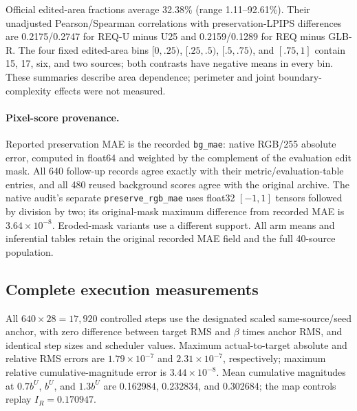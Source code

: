 \documentclass[10pt,doubleanonymous]{ieeeconf}
\begin{document}
Official edited-area fractions average 32.38\% (range 1.11--92.61\%). Their unadjusted Pearson/Spearman correlations with preservation-LPIPS differences are 0.2175/0.2747 for REQ-U minus U25 and 0.2159/0.1289 for REQ minus GLB-R. The four fixed edited-area bins $[0,.25)$, $[.25,.5)$, $[.5,.75)$, and $[.75,1]$ contain 15, 17, six, and two sources; both contrasts have negative means in every bin. These summaries describe area dependence; perimeter and joint boundary-complexity effects were not measured.

\paragraph{Pixel-score provenance.}
Reported preservation MAE is the recorded \texttt{bg\_mae}: native RGB/255 absolute error, computed in float64 and weighted by the complement of the evaluation edit mask. All 640 follow-up records agree exactly with their metric/evaluation-table entries, and all 480 reused background scores agree with the original archive. The native audit's separate \texttt{preserve\_rgb\_mae} uses float32 $[-1,1]$ tensors followed by division by two; its original-mask maximum difference from recorded MAE is $3.64\times10^{-8}$. Eroded-mask variants use a different support. All arm means and inferential tables retain the original recorded MAE field and the full 40-source population.

\subsection{Complete execution measurements}
All $640\times28=17{,}920$ controlled steps use the designated scaled same-source/seed anchor, with zero difference between target RMS and $\beta$ times anchor RMS, and identical step sizes and scheduler values. Maximum actual-to-target absolute and relative RMS errors are $1.79\times10^{-7}$ and $2.31\times10^{-7}$, respectively; maximum relative cumulative-magnitude error is $3.44\times10^{-8}$. Mean cumulative magnitudes at $0.7b^U$, $b^U$, and $1.3b^U$ are 0.162984, 0.232834, and 0.302684; the map controls replay $I_R=0.170947$.


\end{document}
